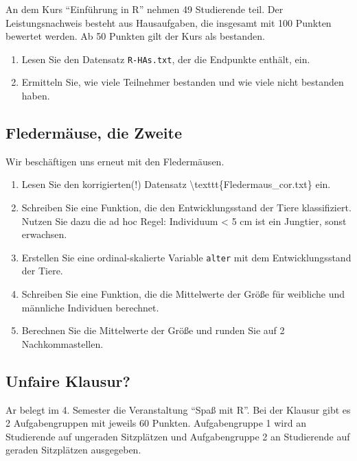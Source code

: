\documentclass[]{book}
\providecommand{\tightlist}{%
  \setlength{\itemsep}{0pt}\setlength{\parskip}{0pt}}
\begin{document}
An dem Kurs ``Einführung in R'' nehmen 49 Studierende teil. Der Leistungsnachweis besteht aus Hausaufgaben, die insgesamt mit 100 Punkten bewertet werden. Ab 50 Punkten gilt der Kurs als bestanden.

\begin{enumerate}
\def\labelenumi{\arabic{enumi}.}
\tightlist
\item
  Lesen Sie den Datensatz \texttt{R-HAs.txt}, der die Endpunkte enthält, ein.
\item
  Ermitteln Sie, wie viele Teilnehmer bestanden und wie viele nicht bestanden haben.
\end{enumerate}

\hypertarget{fledermuxe4use-die-zweite}{%
\subsection{Fledermäuse, die Zweite}\label{fledermuxe4use-die-zweite}}

Wir beschäftigen uns erneut mit den Fledermäusen.

\begin{enumerate}
\def\labelenumi{\arabic{enumi}.}
\tightlist
\item
  Lesen Sie den korrigierten(!) Datensatz \textbackslash{}texttt\{Fledermaus\_cor.txt\} ein.
\item
  Schreiben Sie eine Funktion, die den Entwicklungsstand der Tiere klassifiziert. Nutzen Sie dazu die ad hoc Regel: Individuum \textless{} 5 cm ist ein Jungtier, sonst erwachsen.
\item
  Erstellen Sie eine ordinal-skalierte Variable \texttt{alter} mit dem Entwicklungsstand der Tiere.
\item
  Schreiben Sie eine Funktion, die die Mittelwerte der Größe für weibliche und männliche Individuen berechnet.
\item
  Berechnen Sie die Mittelwerte der Größe und runden Sie auf 2 Nachkommastellen.
\end{enumerate}

\hypertarget{unfaire-klausur}{%
\subsection{Unfaire Klausur?}\label{unfaire-klausur}}

Ar belegt im 4. Semester die Veranstaltung ``Spaß mit R''. Bei der Klausur gibt es 2 Aufgabengruppen mit jeweils 60 Punkten. Aufgabengruppe 1 wird an Studierende auf ungeraden Sitzplätzen und Aufgabengruppe 2 an Studierende auf geraden Sitzplätzen ausgegeben.
\end{document}
